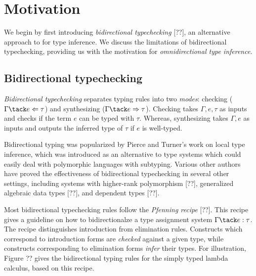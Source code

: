 
\section{Motivation}

We begin by first introducing \textit{bidirectional typechecking} [??], an alternative approach to \HM for type inference. 
We discuss the limitations of bidirectional typechecking, providing us with the motivation for 
\textit{omnidirectional type inference}. 

\subsection{Bidirectional typechecking}

\textit{Bidirectional typechecking} separates typing rules into two \textit{modes}: checking ($\Gamma \tack e \Leftarrow \tau$) and synthesizing ($\Gamma \tack e \Rightarrow \tau$). 
Checking takes $\Gamma, e, \tau$ as inputs and checks if the term $e$ can be typed with $\tau$. Whereas, synthesizing takes $\Gamma, e$ as inputs and outputs the inferred type of $\tau$
if $e$ is well-typed. 

Bidirectional typing was popularized by Pierce and Turner's work on local type inference, which was introduced as an alternative to \HM type systems 
which could easily deal with polymorphic languages with subtyping. Various other authors have proved the effectiveness of bidirectional typechecking 
in several other settings, including systems with higher-rank polymorphism [??], generalized algebraic data types [??], and dependent types [??]. 

Most bidirectional typechecking rules follow the \textit{Pfenning recipe} [??]. This recipe gives a guideline on how to bidirectionalze a type assignment system $\Gamma \tack e : \tau$. 
The recipe distinguishes introduction from elimination rules. Constructs which correspond to introduction forms are \textit{checked} against a given type, 
while constructs corresponding to elimination forms \textit{infer} their types. For illustration, Figure ?? gives the bidirectional typing rules for the simply typed lambda calculus, based on this recipe. 

